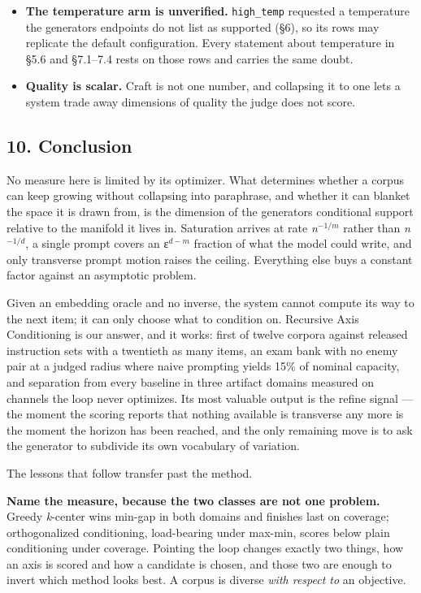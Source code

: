 \documentclass[
  10pt,
]{article}
\theoremstyle{plain}
\theoremstyle{definition}
\begin{document}
\begin{itemize}
  and the scored output. The method does not currently represent that
  coupling.
\item
  \textbf{The temperature arm is unverified.} \texttt{high\_temp}
  requested a temperature the generator\textquotesingle s endpoints do
  not list as supported (§6), so its rows may replicate the default
  configuration. Every statement about temperature in §5.6 and §7.1--7.4
  rests on those rows and carries the same doubt.
\item
  \textbf{Quality is scalar.} Craft is not one number, and collapsing it
  to one lets a system trade away dimensions of quality the judge does
  not score.
\end{itemize}

\subsection{10. Conclusion}\label{10-conclusion}

No measure here is limited by its optimizer. What determines whether a
corpus can keep growing without collapsing into paraphrase, and whether
it can blanket the space it is drawn from, is the dimension of the
generator\textquotesingle s conditional support relative to the manifold
it lives in. Saturation arrives at rate \emph{n}\(^{-1/m}\) rather than
\emph{n}\(^{-1/d}\), a single prompt covers an ε\(^{d-m}\) fraction of
what the model could write, and only transverse prompt motion raises the
ceiling. Everything else buys a constant factor against an asymptotic
problem.

Given an embedding oracle and no inverse, the system cannot compute its
way to the next item; it can only choose what to condition on. Recursive
Axis Conditioning is our answer, and it works: first of twelve corpora
against released instruction sets with a twentieth as many items, an
exam bank with no enemy pair at a judged radius where naive prompting
yields 15\% of nominal capacity, and separation from every baseline in
three artifact domains measured on channels the loop never optimizes.
Its most valuable output is the refine signal --- the moment the scoring
reports that nothing available is transverse any more is the moment the
horizon has been reached, and the only remaining move is to ask the
generator to subdivide its own vocabulary of variation.

The lessons that follow transfer past the method.

\textbf{Name the measure, because the two classes are not one problem.}
Greedy \emph{k}-center wins min-gap in both domains and finishes last on
coverage; orthogonalized conditioning, load-bearing under max-min,
scores below plain conditioning under coverage. Pointing the loop
changes exactly two things, how an axis is scored and how a candidate is
chosen, and those two are enough to invert which method looks best. A
corpus is diverse \emph{with respect to} an objective.
\end{document}
